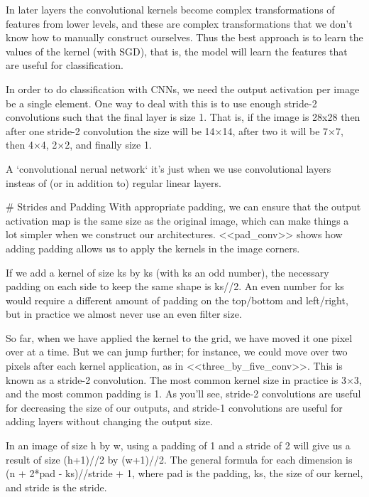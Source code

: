 In later layers the convolutional kernels become complex transformations of features from lower 
levels, and these are complex transformations that we don't know how to manually construct ourselves.
Thus the best approach is to learn the values of the kernel (with SGD), that is, the model will learn
the features that are useful for classification. 


In order to do classification with CNNs, we need the output activation per image be a single element. 
One way to deal with this is to use enough stride-2 convolutions such that the final layer is size 1. 
That is, if the image is 28x28 then after one stride-2 convolution the size will be 14×14, after two 
it will be 7×7, then 4×4, 2×2, and finally size 1.




A `convolutional nerual network` it's just when we use convolutional layers insteas of (or in addition to) 
regular linear layers. 



# Strides and Padding
With appropriate padding, we can ensure that the output activation map is the same size as the original image, 
which can make things a lot simpler when we construct our architectures. <<pad_conv>> shows how adding padding 
allows us to apply the kernels in the image corners.

If we add a kernel of size ks by ks (with ks an odd number), the necessary padding on each side to keep the 
same shape is ks//2. An even number for ks would require a different amount of padding on the top/bottom 
and left/right, but in practice we almost never use an even filter size.

So far, when we have applied the kernel to the grid, we have moved it one pixel over at a time. But we 
can jump further; for instance, we could move over two pixels after each kernel application, as 
in <<three_by_five_conv>>. This is known as a stride-2 convolution. The most common kernel size in 
practice is 3×3, and the most common padding is 1. As you'll see, stride-2 convolutions are useful 
for decreasing the size of our outputs, and stride-1 convolutions are useful for adding layers 
without changing the output size.



In an image of size h by w, using a padding of 1 and a stride of 2 will give us a result of size (h+1)//2 by (w+1)//2. 
The general formula for each dimension is (n + 2*pad - ks)//stride + 1, where pad is the padding, ks, the size of 
our kernel, and stride is the stride.




